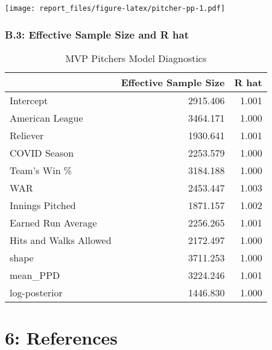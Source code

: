 \documentclass[
]{article}
\begin{document}
\texttt{[image: report\_files/figure-latex/pitcher-pp-1.pdf]}

\hypertarget{b.3-effective-sample-size-and-r-hat}{%
\subsubsection{B.3: Effective Sample Size and R
hat}\label{b.3-effective-sample-size-and-r-hat}}

\begin{table}[H]

\caption{\label{tab:pitcher-diagnostics}MVP Pitchers Model Diagnostics}
\centering
\begin{tabular}[t]{l|r|r}
\hline
  & Effective Sample Size & R hat\\
\hline
Intercept & 2915.406 & 1.001\\
\hline
American League & 3464.171 & 1.000\\
\hline
Reliever & 1930.641 & 1.001\\
\hline
COVID Season & 2253.579 & 1.000\\
\hline
Team's Win \% & 3184.188 & 1.000\\
\hline
WAR & 2453.447 & 1.003\\
\hline
Innings Pitched & 1871.157 & 1.002\\
\hline
Earned Run Average & 2256.265 & 1.001\\
\hline
Hits and Walks Allowed & 2172.497 & 1.000\\
\hline
shape & 3711.253 & 1.000\\
\hline
mean\_PPD & 3224.246 & 1.001\\
\hline
log-posterior & 1446.830 & 1.000\\
\hline
\end{tabular}
\end{table}

\hypertarget{references}{%
\section{6: References}\label{references}}
\end{document}

